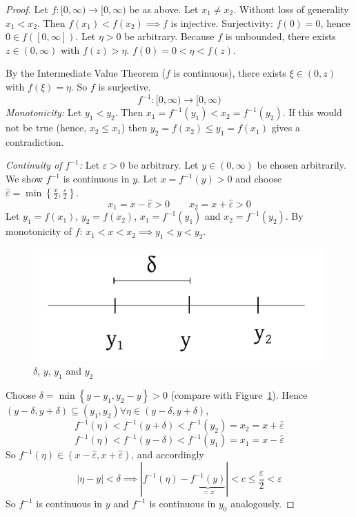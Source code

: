 \documentclass{article}
\newcommand{\set}[1]{\left\{#1\right\}}
\newcommand{\card}[1]{\left|#1\right|}
\begin{document}
\begin{proof}
  Let $f:[0,\infty) \to [0,\infty)$ be as above.
  Let $x_1 \neq x_2$. Without loss of generality $x_1 < x_2$.
  Then $f(x_1) < f(x_2) \implies f$ is injective.
  Surjectivity: $f(0) = 0$, hence $0 \in f([0,\infty])$.
  Let $\eta > 0$ be arbitrary. Because $f$ is unbounded, there exists $z \in (0,\infty)$ with $f(z) > \eta$.
  $f(0) = 0 < \eta < f(z)$.

  By the Intermediate Value Theorem ($f$ is continuous), there exists $\xi \in (0,z)$ with $f(\xi) = \eta$.
  So $f$ is surjective.
  \[ f^{-1}: [0,\infty) \to [0,\infty) \]
  \emph{Monotonicity:} Let $y_1 < y_2$. Then $x_1 = f^{-1}(y_1) < x_2 = f^{-1}(y_2)$.
  If this would not be true (hence, $x_2 \leq x_1$) then $y_2 = f(x_2) \leq y_1 = f(x_1)$ gives a contradiction.

  \emph{Continuity of $f^{-1}$:}
  Let $\varepsilon > 0$ be arbitrary. Let $y \in (0,\infty)$ be chosen arbitrarily.
  We show $f^{-1}$ is continuous in $y$.
  Let $x = f^{-1}(y) > 0$ and choose $\hat\varepsilon = \min\set{\frac{x}2, \frac{\varepsilon}2}$.
  \[ x_1 = x - \hat\varepsilon > 0 \qquad x_2 = x + \hat \varepsilon > 0 \]
  Let $y_1 = f(x_1)$, $y_2 = f(x_2)$, $x_1 = f^{-1}(y_1)$ and $x_2 = f^{-1}(y_2)$.
  By monotonicity of $f$: $x_1 < x < x_2 \implies y_1 < y < y_2$.

  \begin{figure}[t]
    \begin{center}
      \includegraphics[width=.5\textwidth]{img/24_setup_delta.pdf}
      \caption{$\delta$, $y$, $y_1$ and $y_2$}
      \label{img:dyyy}
    \end{center}
  \end{figure}

  Choose $\delta = \min\set{y - y_1, y_2 - y} > 0$ (compare with Figure~\ref{img:dyyy}).
  Hence $(y - \delta, y + \delta) \subseteq (y_1, y_2) \forall \eta \in (y - \delta, y + \delta)$,
  \[ f^{-1}(\eta) < f^{-1}(y + \delta) < f^{-1}(y_2) = x_2 = x + \hat\varepsilon \]
  \[ f^{-1}(\eta) < f^{-1}(y - \delta) < f^{-1}(y_1) = x_1 = x - \hat\varepsilon \]
  So $f^{-1}(\eta) \in (x - \hat{\varepsilon}, x + \hat{\varepsilon})$, and accordingly
  \[ \card{\eta - y} < \delta \implies \card{f^{-1}(\eta) - \underbrace{f^{-1}(y)}_{=x}} < c \leq \frac{\varepsilon}{2} < \varepsilon \]
  So $f^{-1}$ is continuous in $y$ and $f^{-1}$ is continuous in $y_0$ analogously.
\end{proof}
\end{document}
